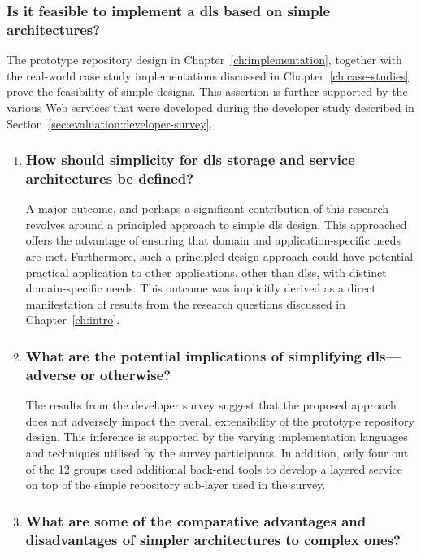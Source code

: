 \subsubsection*{Is it feasible to implement a \gls{dls} based on simple architectures?}

The prototype repository design in Chapter~\ref{ch:implementation}, together with the real-world case study implementations discussed in Chapter~\ref{ch:case-studies} prove the feasibility of simple designs. This assertion is further supported by the various Web services that were developed during the developer study described in Section~\ref{sec:evaluation:developer-survey}.

\begin{enumerate}[label=\roman*]
 \item \subsubsection*{How should simplicity for \gls{dls} storage and service architectures be defined?}
 
 A major outcome, and perhaps a significant contribution of this research revolves around a principled approach to simple \gls{dls} design. This approached offers the advantage of ensuring that domain and application-specific needs are met. Furthermore, such a principled design approach could have potential practical application to other applications, other than \glspl{dls}, with distinct domain-specific needs. This outcome was implicitly derived as a direct manifestation of results from the research questions discussed in Chapter~\ref{ch:intro}.
 
 \item \subsubsection*{What are the potential implications of simplifying \gls{dls}---adverse or otherwise?}
 
 The results from the developer survey suggest that the proposed approach does not adversely impact the overall extensibility of the prototype repository design. This inference is supported by the varying implementation languages and techniques utilised by the survey participants. In addition, only four out of the 12 groups used additional back-end tools to develop a layered service on top of the simple repository sub-layer used in the survey.
 
 \item \subsubsection*{What are some of the comparative advantages and disadvantages of simpler architectures to complex ones?}
 

\end{enumerate}
